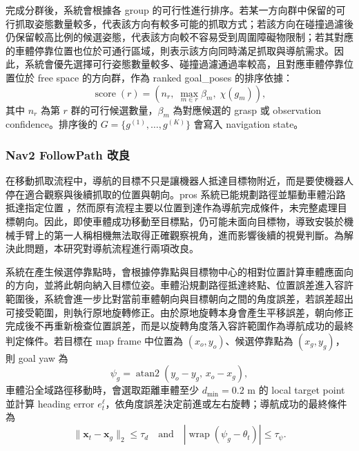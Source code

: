 \documentclass[12pt,a4paper]{article}
\makeatletter
\renewcommand\paragraph{\@startsection{paragraph}{4}{\z@}{1.3em}{0.5em}{\normalsize\bfseries}}
\makeatother
\begin{document}
完成分群後，系統會根據各 group 的可行性進行排序。若某一方向群中保留的可行抓取姿態數量較多，代表該方向有較多可能的抓取方式；若該方向在碰撞過濾後仍保留較高比例的候選姿態，代表該方向較不容易受到周圍障礙物限制；若其對應的車體停靠位置也位於可通行區域，則表示該方向同時滿足抓取與導航需求。因此，系統會優先選擇可行姿態數量較多、碰撞過濾通過率較高，且對應車體停靠位置位於 free space 的方向群，作為 ranked goal\_poses 的排序依據：
\begin{equation}
    \operatorname{score}(r)=\left(n_r,\;\max_{m\in r}\beta_m,\;\chi(g_m)\right),
\end{equation}
其中 $n_r$ 為第 $r$ 群的可行候選數量，$\beta_m$ 為對應候選的 grasp 或 observation confidence。排序後的 $G=\{g^{(1)},\ldots,g^{(K)}\}$ 會寫入 navigation state。

\subsubsection{Nav2 FollowPath 改良}

在移動抓取流程中，導航的目標不只是讓機器人抵達目標物附近，而是要使機器人停在適合觀察與後續抓取的位置與朝向。pros 系統已能規劃路徑並驅動車體沿路抵達指定位置 \cite{yushiang2025}，然而原有流程主要以位置到達作為導航完成條件，未完整處理目標朝向。因此，即使車體成功移動至目標點，仍可能未面向目標物，導致安裝於機械手臂上的第一人稱相機無法取得正確觀察視角，進而影響後續的視覺判斷。為解決此問題，本研究對導航流程進行兩項改良。

\paragraph{朝向修正}
系統在產生候選停靠點時，會根據停靠點與目標物中心的相對位置計算車體應面向的方向，並將此朝向納入目標位姿。車體沿規劃路徑抵達終點、位置誤差進入容許範圍後，系統會進一步比對當前車體朝向與目標朝向之間的角度誤差，若誤差超出可接受範圍，則執行原地旋轉修正。由於原地旋轉本身會產生平移誤差，朝向修正完成後不再重新檢查位置誤差，而是以旋轉角度落入容許範圍作為導航成功的最終判定條件。若目標在 map frame 中位置為 $(x_o,y_o)$、候選停靠點為 $(x_g,y_g)$，則 goal yaw 為
\begin{equation}
    \psi_g=\operatorname{atan2}(y_o-y_g,\,x_o-x_g),
\end{equation}
車體沿全域路徑移動時，會選取距離車體至少 $d_{\min}=0.2$ m 的 local target point 並計算 heading error $e^{\ell}_t$，依角度誤差決定前進或左右旋轉；導航成功的最終條件為
\begin{equation}
    \lVert \mathbf{x}_t-\mathbf{x}_g\rVert_2\leq \tau_d
    \quad\text{and}\quad
    |\operatorname{wrap}(\psi_g-\theta_t)|\leq \tau_{\psi}.
\end{equation}
\end{document}
